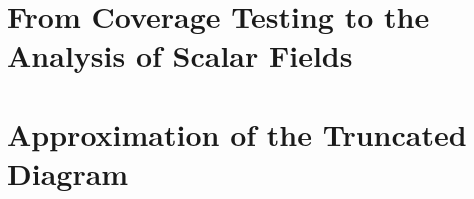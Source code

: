 \documentclass[12pt]{article}
\begin{document}
% 
%
%   
%
%   

\section{From Coverage Testing to the Analysis of Scalar Fields}\label{sec:middle}


%   
%
%   
%
%   
%   
%   


\section{Approximation of the Truncated Diagram}\label{sec:truncations}


%   

\clearpage


\end{document}
